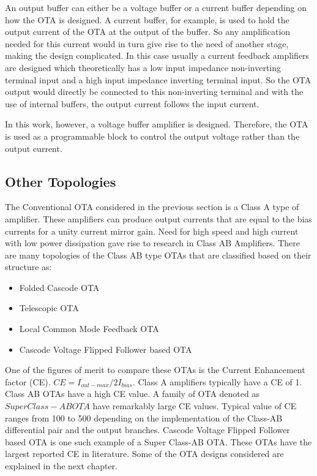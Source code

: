 An output buffer can either be a voltage buffer or a current buffer depending on how the OTA is designed. A current buffer, for example, is used to hold the output current of the OTA at the output of the buffer. So any amplification needed for this current would in turn give rise to the need of another stage, making the design complicated. In this case usually a current feedback amplifiers are designed which theoretically has a low input impedance non-inverting terminal input and a high input impedance inverting terminal input. So the OTA output would directly be connected to this non-inverting terminal and with the use of internal buffers, the output current follows the input current.

In this work, however, a voltage buffer amplifier is designed. Therefore, the OTA is used as a programmable block to control the output voltage rather than the output current.

\subsection{Other Topologies}
The Conventional OTA considered in the previous section is a Class A type of amplifier. These amplifiers can produce output currents that are equal to the bias currents for a unity current mirror gain. Need for high speed and high current with low power dissipation gave rise to research in Class AB Amplifiers. There are many topologies of the Class AB type OTAs that are classified based on their structure as:
\begin{itemize}
\item Folded Cascode OTA
\item Telescopic OTA
\item Local Common Mode Feedback OTA
\item Cascode Voltage Flipped Follower based OTA
\end{itemize}

One of the figures of merit to compare these OTAs is the Current Enhancement factor (CE). $CE = I_{out-max}/2I_{bias}$. Class A amplifiers typically have a CE of 1. Class AB OTAs have a high CE value. A family of OTA denoted as $Super Class-AB OTA$ have remarkably large CE values. Typical value of CE ranges from 100 to 500 depending on the implementation of the Class-AB differential pair and the output branches. Cascode Voltage Flipped Follower based OTA is one such example of a Super Class-AB OTA. These OTAs have the largest reported CE in literature. Some of the OTA designs considered are explained in the next chapter.


